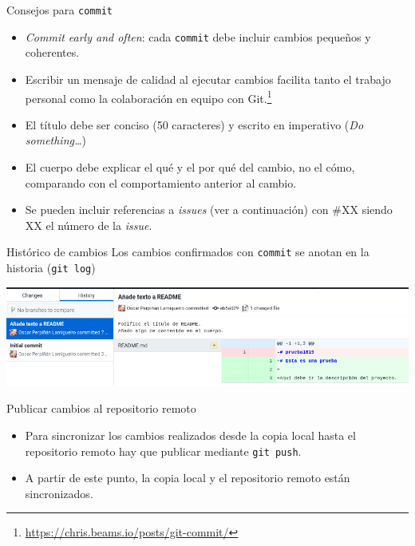 \documentclass[aspectratio=169, xcolor={usenames,svgnames,dvipsnames}]{beamer}
\begin{document}
\begin{frame}[label={sec:org8349599},fragile]{Consejos para \texttt{commit}}
 \begin{itemize}
\item \emph{Commit early and often}: cada \texttt{commit} debe incluir cambios pequeños y coherentes.

\item Escribir un mensaje de calidad al ejecutar cambios facilita tanto el trabajo personal como la colaboración en equipo con Git.\footnote{\url{https://chris.beams.io/posts/git-commit/}}

\item El \alert{título} debe ser \alert{conciso} (50 caracteres) y escrito en imperativo (\emph{Do something\ldots{}})

\item El \alert{cuerpo} debe explicar \alert{el qué y el por qué del cambio}, no el cómo, comparando con el comportamiento anterior al cambio.

\item Se pueden incluir referencias a \emph{issues} (ver a continuación) con \#XX siendo XX el número de la \emph{issue}.
\end{itemize}
\end{frame}
\begin{frame}[label={sec:orgb8e7595},fragile]{Histórico de cambios}
 Los cambios confirmados con \texttt{commit} se anotan en la historia (\texttt{git log})

\begin{center}
\end{center}

\begin{center}
\includegraphics[width=.9\linewidth]{figs/git_history.png}
\end{center}
\end{frame}


\begin{frame}[label={sec:orgf2e00ff},fragile]{Publicar cambios al repositorio remoto}
 \begin{itemize}
\item Para sincronizar  los cambios realizados \alert{desde la copia local hasta el repositorio remoto} hay que publicar mediante \texttt{git push}.
\end{itemize}

\begin{center}
\end{center}

\begin{itemize}
\item A partir de este punto, la copia local y el repositorio remoto están sincronizados.
\end{itemize}
\end{frame}
\end{document}
